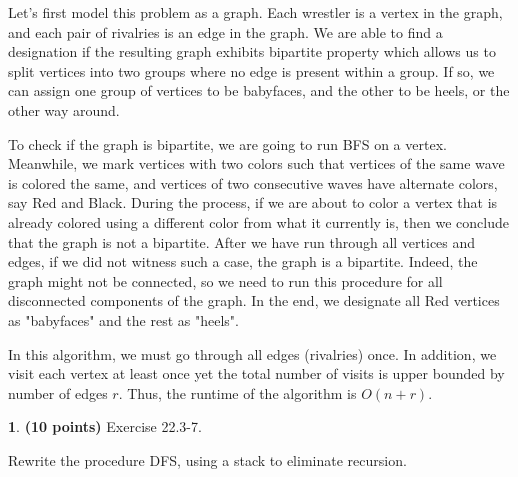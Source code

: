 \documentclass[11pt]{article}
\theoremstyle{definition}
\theoremstyle{theorem}
\newtheorem{prob}{}
\newcommand{\solution}{\medskip\noindent{\color{DarkBlue}\textbf{Solution:}}}
\begin{document}
\solution

Let's first model this problem as a graph. Each wrestler is a vertex in the graph, and each pair of rivalries is an edge in the graph. We are able to find a designation if the resulting graph exhibits bipartite property which allows us to split vertices into two groups where no edge is present within a group. If so, we can assign one group of vertices to be babyfaces, and the other to be heels, or the other way around. 

To check if the graph is bipartite, we are going to run BFS on a vertex. Meanwhile, we mark vertices with two colors such that vertices of the same wave is colored the same, and vertices of two consecutive waves have alternate colors, say Red and Black. During the process, if we are about to color a vertex that is already colored using a different color from what it currently is, then we conclude that the graph is not a bipartite. After we have run through all vertices and edges, if we did not witness such a case, the graph is a bipartite. Indeed, the graph might not be connected, so we need to run this procedure for all disconnected components of the graph. In the end, we designate all Red vertices as "babyfaces" and the rest as "heels".

In this algorithm, we must go through all edges (rivalries) once. In addition, we visit each vertex at least once yet the total number of visits is upper bounded by number of edges $r$. Thus, the runtime of the algorithm is $O(n + r)$.


\newpage
\begin{prob} \textbf{(10 points)} Exercise 22.3-7.
\end{prob}

Rewrite the procedure DFS, using a stack to eliminate recursion.

\solution
\end{document}
